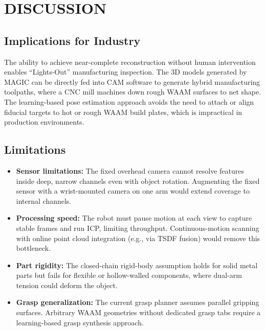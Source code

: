 \documentclass[letterpaper, 10 pt, conference]{ieeeconf}  %
\begin{document}
\section{DISCUSSION}

\subsection{Implications for Industry}

The ability to achieve near-complete reconstruction without human intervention
enables ``Lights-Out'' manufacturing inspection. The 3D models generated by
MAGIC can be directly fed into CAM software to generate hybrid manufacturing
toolpaths, where a CNC mill machines down rough WAAM surfaces to net shape.
The learning-based pose estimation approach avoids the need to attach or align
fiducial targets to hot or rough WAAM build plates, which is impractical in
production environments.

\subsection{Limitations}

\begin{itemize}
    \item \textbf{Sensor limitations:} The fixed overhead camera cannot
    resolve features inside deep, narrow channels even with object rotation.
    Augmenting the fixed sensor with a wrist-mounted camera on one arm would
    extend coverage to internal channels.

    \item \textbf{Processing speed:} The robot must pause motion at each
    view to capture stable frames and run ICP, limiting throughput.
    Continuous-motion scanning with online point cloud integration (e.g., via
    TSDF fusion) would remove this bottleneck.

    \item \textbf{Part rigidity:} The closed-chain rigid-body assumption holds
    for solid metal parts but fails for flexible or hollow-walled components,
    where dual-arm tension could deform the object.

    \item \textbf{Grasp generalization:} The current grasp planner assumes
    parallel gripping surfaces. Arbitrary WAAM geometries without dedicated
    grasp tabs require a learning-based grasp synthesis approach.
\end{itemize}
\end{document}
